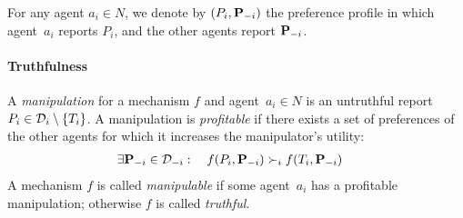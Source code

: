 For any agent $a_i \in N$, we denote by $(P_i, \mathbf{P}_{-i})$ the preference profile in which agent~$a_i$ reports $P_i$, and the other agents report $\mathbf{P}_{-i}$.







\paragraph{Truthfulness}
A \emph{manipulation} for a mechanism $f$ and agent~$a_i \in N$ is an untruthful report $P_i \in \mathcal{D}_i \setminus \{T_i\}$.
A manipulation is \emph{profitable} if there exists a set of preferences of the other agents for which it increases the manipulator's utility:
\begin{align}
\label{eq:manipulation}
    &\exists \mathbf{P}_{-i}\in \mathbf{\mathcal{D}}_{-i} : \quad f(P_i,\mathbf{P}_{-i}) \succ_i f(T_i,\mathbf{P}_{-i})
\end{align}
%
%
%
%
%
A mechanism $f$ is called \emph{manipulable} if some agent~$a_i$ has a profitable manipulation; otherwise $f$ is called \emph{truthful}. 




